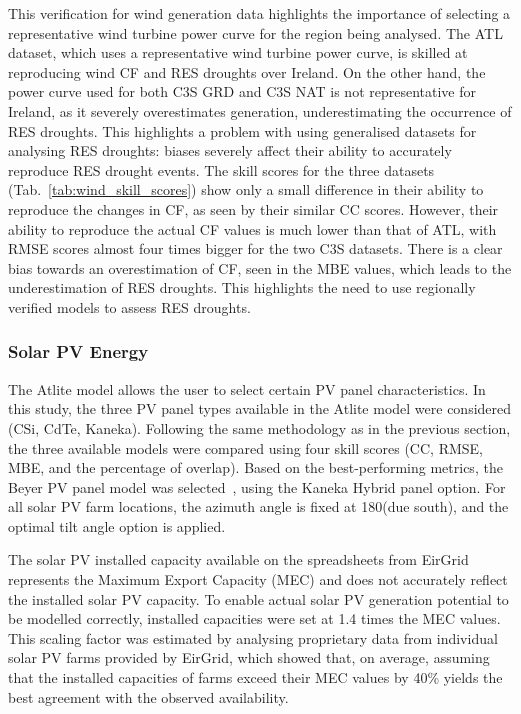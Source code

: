 \documentclass[preprint, 12pt]{elsarticle}
\begin{document}
This verification for wind generation data highlights the importance of selecting a representative wind turbine power curve for the region being analysed. The ATL dataset, which uses a representative wind turbine power curve, is skilled at reproducing wind CF and RES droughts over Ireland. On the other hand, the power curve used for both C3S GRD and C3S NAT is not representative for Ireland, as it severely overestimates generation, underestimating the occurrence of RES droughts. This highlights a problem with using generalised datasets for analysing RES droughts: biases severely affect their ability to accurately reproduce RES drought events. The skill scores for the three datasets (Tab.~\ref{tab:wind_skill_scores}) show only a small difference in their ability to reproduce the changes in CF, as seen by their similar CC scores. However, their ability to reproduce the actual CF values is much lower than that of ATL, with RMSE scores almost four times bigger for the two C3S datasets. There is a clear bias towards an overestimation of CF, seen in the MBE values, which leads to the underestimation of RES droughts. This highlights the need to use regionally verified models to assess RES droughts.

\subsubsection{Solar PV Energy}
\label{sec:pv_verification}

The Atlite model allows the user to select certain PV panel characteristics. In this study, the three PV panel types available in the Atlite model were considered (CSi, CdTe, Kaneka). Following the same methodology as in the previous section, the three available models were compared using four skill scores (CC, RMSE, MBE, and the percentage of overlap). Based on the best-performing metrics, the Beyer PV panel model was selected~\citep{beyer2004pv}, using the Kaneka Hybrid panel option. For all solar PV farm locations, the azimuth angle is fixed at 180\textdegree (due south), and the optimal tilt angle option is applied. 

The solar PV installed capacity available on the spreadsheets from EirGrid represents the Maximum Export Capacity (MEC) and does not accurately reflect the installed solar PV capacity. To enable actual solar PV generation potential to be modelled correctly, installed capacities were set at 1.4 times the MEC values. This scaling factor was estimated by analysing proprietary data from individual solar PV farms provided by EirGrid, which showed that, on average, assuming that the installed capacities of farms exceed their MEC values by 40\% yields the best agreement with the observed availability.
\end{document}
